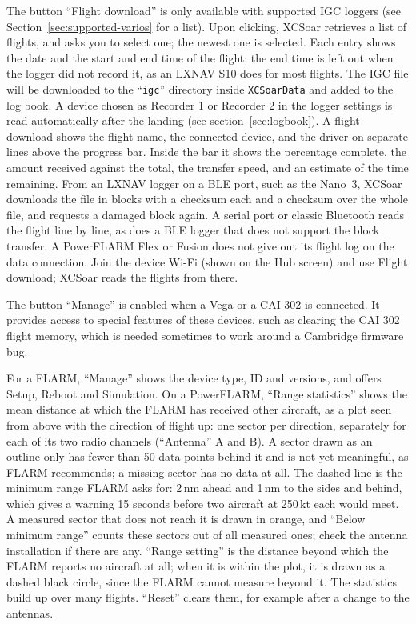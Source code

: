 The button ``Flight download'' is only available with supported IGC
loggers (see Section~\ref{sec:supported-varios} for a list).  Upon clicking,
XCSoar retrieves a list of flights, and asks you to select one; the
newest one is selected.  Each
entry shows the date and the start and end time of the flight; the end
time is left out when the logger did not record it, as an LXNAV S10
does for most flights.  The
IGC file will be downloaded to the ``\texttt{igc}'' directory inside
\texttt{XCSoarData} and added to the log book.  A device chosen as
Recorder 1 or Recorder 2 in the logger settings is read automatically
after the landing (see section~\ref{sec:logbook}).  A flight download shows the flight name, the connected device, and the
driver on separate lines above the progress bar.  Inside the bar it
shows the percentage complete, the amount received against the total,
the transfer speed, and an estimate of the time remaining.
From an LXNAV logger on a BLE port, such as the Nano~3, XCSoar
downloads the file in blocks with a checksum each and a checksum over
the whole file, and requests a damaged block again.  A serial port or
classic Bluetooth reads the flight line by line, as does a BLE logger
that does not support the block transfer.
A PowerFLARM Flex or Fusion does not give out its flight log on the
data connection.  Join the device Wi-Fi (shown on the Hub screen) and
use Flight download; XCSoar reads the flights from there.

The button ``Manage'' is enabled when a Vega or a CAI 302 is
connected.  It provides access to special features of these devices,
such as clearing the CAI 302 flight memory, which is needed sometimes
to work around a Cambridge firmware bug.

For a FLARM, ``Manage'' shows the device type, ID and versions, and
offers Setup, Reboot and Simulation.  On a PowerFLARM, ``Range
statistics'' shows the mean distance at which the FLARM has received
other aircraft, as a plot seen from above with the direction of flight
up: one sector per direction, separately for each of its two radio
channels (``Antenna'' A and B).  A sector drawn as an outline only has
fewer than 50 data points behind it and is not yet meaningful, as
FLARM recommends; a missing sector has no data at all.  The dashed
line is the minimum range FLARM asks for: 2\,nm ahead and 1\,nm to
the sides and behind, which gives a warning 15 seconds before two
aircraft at 250\,kt each would meet.  A measured sector that does not
reach it is drawn in orange, and ``Below minimum range'' counts these
sectors out of all measured ones; check the antenna installation if
there are any.  ``Range setting'' is the distance beyond which the
FLARM reports no aircraft at all; when it is within the plot, it is
drawn as a dashed black circle, since the FLARM cannot measure beyond
it.  The statistics build up over many flights.  ``Reset''
clears them, for example after a change to the antennas.

